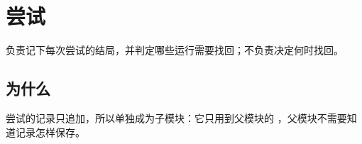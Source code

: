 \section{尝试}

负责记下每次尝试的结局，并判定哪些运行需要找回；不负责决定何时找回。

\subsection{为什么}

尝试的记录只追加，所以单独成为子模块：它只用到父模块的 ，父模块不需要知道记录怎样保存。
